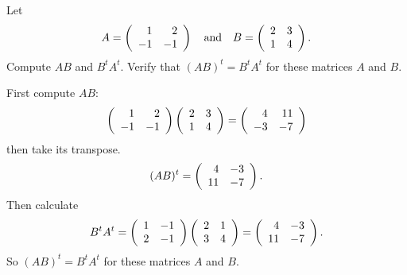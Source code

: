 \documentclass{ximera}
\begin{document}
\begin{exercise} \label{c4.7.3}
Let
\[
A=\mattwo{1}{2}{-1}{-1} \AND B =\mattwo{2}{3}{1}{4}.
\]
Compute $AB$ and $B^tA^t$.  Verify that $(AB)^t=B^tA^t$ for these
matrices $A$ and $B$.

\begin{solution}
\soln 
First compute $AB$:
\[ 
\mattwo{1}{2}{-1}{-1}\mattwo{2}{3}{1}{4} = \mattwo{4}{11}{-3}{-7} 
\]
then take its transpose.
\[ 
(AB)^t = \mattwo{4}{-3}{11}{-7}. 
\]
Then calculate
\[ 
B^tA^t = \mattwo{1}{-1}{2}{-1}\mattwo{2}{1}{3}{4} = \mattwo{4}{-3}{11}{-7}. 
\]
So $(AB)^t = B^tA^t$ for these matrices $A$ and $B$.
\end{solution}
\end{exercise}
\end{document}
